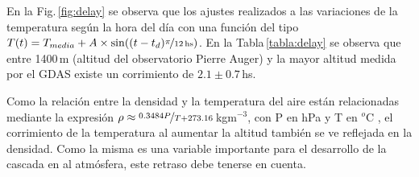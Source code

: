 En la Fig.\,\ref{fig:delay} se observa que los ajustes realizados a las variaciones de la temperatura  según la hora del día con una función del tipo $T(t) = T_{media} + A\times \sin((t-t_d)\nicefrac{\pi}{12\,\text{hs}})$.  En la Tabla\,\ref{tabla:delay} se observa que entre 1400\,m (altitud del observatorio Pierre Auger) y la mayor altitud medida por el GDAS existe un corrimiento de $2.1\pm0.7\,$hs.

Como la relación entre la densidad y la temperatura del aire están relacionadas mediante la expresión $\rho \approx \nicefrac{0.3484P}{T +273.16}\,$kgm$^{-3}$, con P en hPa y T en  $^o$C \cite{aab2017impact}, el corrimiento de la temperatura al aumentar la altitud también se ve reflejada en la densidad. Como la misma es una variable importante para el desarrollo de la cascada en al atmósfera, este retraso debe tenerse en cuenta.

